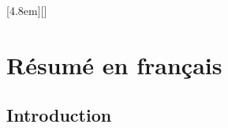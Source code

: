\documentclass[thesis]{subfiles}
\begin{document}
\begin{otherlanguage}{french}

\renewcommand{\thesection}{\arabic{section}}
\renewcommand{\thesubsection}{\arabic{section}.\arabic{subsection}}
\renewcommand{\thefigure}{R\arabic{figure}}
\setcounter{figure}{0}
[4.8em]{\addvspace{0.1em}}{\contentslabel{2.2em}}{}{\contentspage}[]

\chapter*{Résumé en français}
\startcontents[chapters]
\printpartialtoc

\section*{Introduction}






\end{otherlanguage}

\OnlyInSubfile{\printglobalbibliography}
\end{document}
